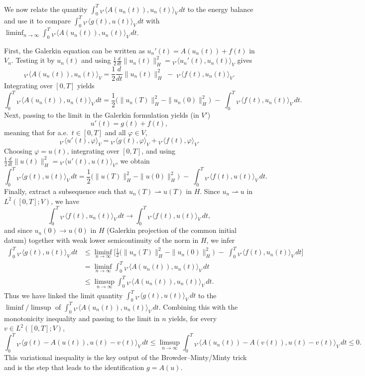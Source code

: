 \documentclass[11pt]{article}
\theoremstyle{definition}
\theoremstyle{remark}
\newcommand{\dual}[2]{{}_{V'}\langle #1, #2 \rangle_{V}}
\begin{document}
\medskip
We now relate the quantity $\int_0^T \dual{A(u_n(t))}{u_n(t)}\,dt$ to the energy balance and use
it to compare $\int_0^T \dual{g(t)}{u(t)}\,dt$ with $\liminf_{n\to\infty}\int_0^T \dual{A(u_n(t))}{u_n(t)}\,dt$.

First, the Galerkin equation can be written as $u_n'(t)=A(u_n(t))+f(t)$ in $V_n$.
Testing it by $u_n(t)$ and using $\frac12\frac{d}{dt}\|u_n(t)\|_H^2=\dual{u_n'(t)}{u_n(t)}$ gives
\[
\dual{A(u_n(t))}{u_n(t)}
=
\frac12\frac{d}{dt}\|u_n(t)\|_H^2
\;-\;
\dual{f(t)}{u_n(t)}.
\]
Integrating over $[0,T]$ yields
\[
\int_0^T \dual{A(u_n(t))}{u_n(t)}\,dt
=
\frac12\bigl(\|u_n(T)\|_H^2-\|u_n(0)\|_H^2\bigr)
\;-\;
\int_0^T \dual{f(t)}{u_n(t)}\,dt.
\]
\medskip
Next, passing to the limit in the Galerkin formulation yields (in $V'$)
\[
u'(t)=g(t)+f(t),
\]
meaning that for a.e.\ $t\in[0,T]$ and all $\varphi\in V$,
\[
\dual{u'(t)}{\varphi}=\dual{g(t)}{\varphi}+\dual{f(t)}{\varphi}.
\]
Choosing $\varphi=u(t)$, integrating over $[0,T]$, and using
$\frac12\frac{d}{dt}\|u(t)\|_H^2=\dual{u'(t)}{u(t)}$, we obtain
\[
\int_0^T \dual{g(t)}{u(t)}\,dt
=
\frac12\bigl(\|u(T)\|_H^2-\|u(0)\|_H^2\bigr)
\;-\;
\int_0^T \dual{f(t)}{u(t)}\,dt.
\]
\medskip
Finally, extract a subsequence such that $u_n(T)\rightharpoonup u(T)$ in $H$.
Since $u_n\rightharpoonup u$ in $L^2([0,T];V)$, we have
\[
\int_0^T \dual{f(t)}{u_n(t)}\,dt \longrightarrow \int_0^T \dual{f(t)}{u(t)}\,dt,
\]
and since $u_n(0)\to u(0)$ in $H$ (Galerkin projection of the common initial datum) together with
weak lower semicontinuity of the norm in $H$, we infer
\[
\begin{aligned}
\int_0^T \dual{g(t)}{u(t)}\,dt
&\le
\liminf_{n\to\infty}\Biggl[
\frac12\bigl(\|u_n(T)\|_H^2-\|u_n(0)\|_H^2\bigr)
\;-\;
\int_0^T \dual{f(t)}{u_n(t)}\,dt
\Biggr]\\
&=
\liminf_{n\to\infty}\int_0^T \dual{A(u_n(t))}{u_n(t)}\,dt\\
&\le
\limsup_{n\to\infty}\int_0^T \dual{A(u_n(t))}{u_n(t)}\,dt.
\end{aligned}
\]
Thus we have linked the limit quantity $\int_0^T\dual{g(t)}{u(t)}\,dt$ to the $\liminf/\limsup$ of
$\int_0^T \dual{A(u_n(t))}{u_n(t)}\,dt$.
Combining this with the monotonicity inequality and passing to the limit in $n$ yields, for every
$v\in L^2([0,T];V)$,
\[
\int_0^T \dual{g(t)-A(u(t))}{u(t)-v(t)}\,dt
\le
\limsup_{n\to\infty}\int_0^T \dual{A(u_n(t))-A(v(t))}{u(t)-v(t)}\,dt
\le
0.
\]
This variational inequality is the key output of the Browder--Minty/Minty trick and is the step
that leads to the identification $g=A(u)$.
\end{document}
